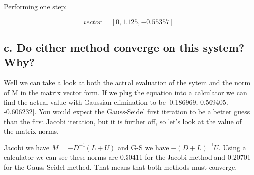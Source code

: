 \documentclass[]{article}
\begin{document}
Performing one step:

\[vector = [0, 1.125, -0.55357]\]

\hypertarget{c.-do-either-method-converge-on-this-system-why}{%
\subsection{c. Do either method converge on this system?
Why?}\label{c.-do-either-method-converge-on-this-system-why}}

Well we can take a look at both the actual evaluation of the sytem and
the norm of M in the matrix vector form. If we plug the equation into a
calculator we can find the actual value with Gaussian elimination to be
{[}0.186969, 0.569405, -0.606232{]}. You would expect the Gauss-Seidel
first iteration to be a better guess than the first Jacobi iteration,
but it is further off, so let's look at the value of the matrix norms.

Jacobi we have \(M = -D^{-1}(L+U)\) and G-S we have \(-(D + L)^{-1}U\).
Using a calculator we can see these norms are 0.50411 for the Jacobi
method and 0.20701 for the Gauss-Seidel method. That means that both
methods must converge.
\end{document}
